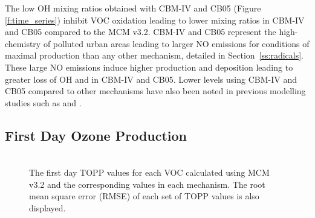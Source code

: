 The low OH mixing ratios obtained with CBM-IV and CB05 (Figure \ref{f:time_series}) inhibit VOC oxidation leading to lower  mixing ratios in CBM-IV and CB05 compared to the MCM v3.2. 
CBM-IV and CB05 represent the high- chemistry of polluted urban areas leading to larger NO emissions for conditions of maximal  production than any other mechanism, detailed in \mbox{Section \ref{ss:radicals}}.
These large NO emissions induce higher  production and deposition leading to greater loss of OH and  in CBM-IV and CB05.
Lower  levels using CBM-IV and CB05 compared to other mechanisms have also been noted in previous modelling studies such as \citet{Emmerson:2009} and \citet{Saylor:2012}.

\subsection{First Day Ozone Production} \label{ss:day1} %

\begin{figure}
    \centering
    \includegraphics[width=\textwidth]{img/first_day_values}
    \vspace{1mm}
    \caption{The first day TOPP values for each VOC calculated using MCM v3.2 and the corresponding values in each mechanism. The root mean square error (RMSE) of each set of TOPP values is also displayed.}
    \vspace{-4mm}
    \label{f:first_day}
\end{figure}

